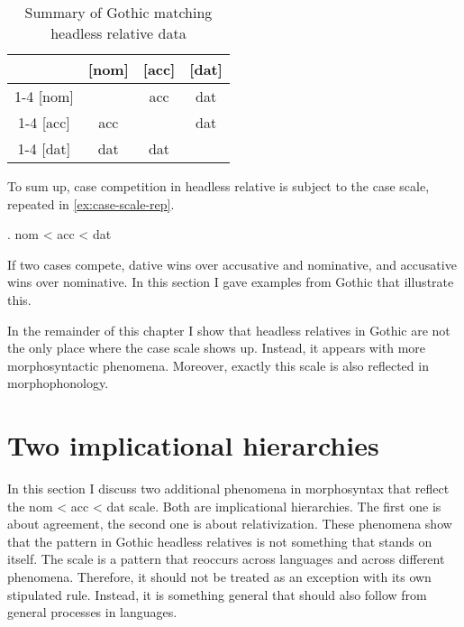 \begin{table}[H]
  \center
  \caption {Summary of Gothic matching headless relative data}
    \begin{tabular}{c|c|c|c}
      \toprule
            & [\ac{nom}]
            & [\ac{acc}]
            & [\ac{dat}]
            \\ \cmidrule{1-4}
        [\ac{nom}]
            &
            & \ac{acc}
            & \ac{dat}
            \\ \cmidrule{1-4}
        [\ac{acc}]
            & \ac{acc}
            &
            & \ac{dat}
            \\ \cmidrule{1-4}
        [\ac{dat}]
            & \ac{dat}
            & \ac{dat}
            &
            \\
      \bottomrule
    \end{tabular}
    \label{tbl:summary-gothic-1}
\end{table}

To sum up, case competition in headless relative is subject to the case scale, repeated in \ref{ex:case-scale-rep}.

\ex. \ac{nom} < \ac{acc} < \ac{dat}\label{ex:case-scale-rep}

If two cases compete, dative wins over accusative and nominative, and accusative wins over nominative. In this section I gave examples from Gothic that illustrate this.

In the remainder of this chapter I show that headless relatives in Gothic are not the only place where the case scale shows up. Instead, it appears with more morphosyntactic phenomena. Moreover, exactly this scale is also reflected in morphophonology.


\section{Two implicational hierarchies}

In this section I discuss two additional phenomena in morphosyntax that reflect the \ac{nom} < \ac{acc} < \ac{dat} scale. Both are implicational hierarchies. The first one is about agreement, the second one is about relativization. These phenomena show that the pattern in Gothic headless relatives is not something that stands on itself. The scale is a pattern that reoccurs across languages and across different phenomena. Therefore, it should not be treated as an exception with its own stipulated rule. Instead, it is something general that should also follow from general processes in languages.


